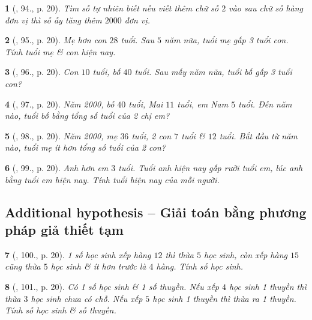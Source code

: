 \documentclass{article}
\newtheorem{baitoan}{}
\begin{document}
\begin{baitoan}[\cite{Binh_Toan_6_tap_1}, 94., p. 20]
	Tìm số tự nhiên biết nếu viết thêm chữ số $2$ vào sau chữ số hàng đơn vị thì số ấy tăng thêm $2000$ đơn vị.
\end{baitoan}

\begin{baitoan}[\cite{Binh_Toan_6_tap_1}, 95., p. 20]
	Mẹ hơn con $28$ tuổi. Sau $5$ năm nữa, tuổi mẹ gấp 3 tuổi con. Tính tuổi mẹ \& con hiện nay.
\end{baitoan}

\begin{baitoan}[\cite{Binh_Toan_6_tap_1}, 96., p. 20]
	Con $10$ tuổi, bố $40$ tuổi. Sau mấy năm nữa, tuổi bố gấp 3 tuổi con?
\end{baitoan}

\begin{baitoan}[\cite{Binh_Toan_6_tap_1}, 97., p. 20]
	Năm 2000, bố $40$ tuổi, Mai $11$ tuổi, em Nam $5$ tuổi. Đến năm nào, tuổi bố bằng tổng số tuổi của 2 chị em?
\end{baitoan}

\begin{baitoan}[\cite{Binh_Toan_6_tap_1}, 98., p. 20]
	Năm 2000, mẹ $36$ tuổi, 2 con $7$ tuổi \& $12$ tuổi. Bắt đầu từ năm nào, tuổi mẹ ít hơn tổng số tuổi của 2 con?
\end{baitoan}

\begin{baitoan}[\cite{Binh_Toan_6_tap_1}, 99., p. 20]
	Anh hơn em $3$ tuổi. Tuổi anh hiện nay gấp rưỡi tuổi em, lúc anh bằng tuổi em hiện nay. Tính tuổi hiện nay của mỗi người.
\end{baitoan}

\subsection{Additional hypothesis -- Giải toán bằng phương pháp giả thiết tạm}

\begin{baitoan}[\cite{Binh_Toan_6_tap_1}, 100., p. 20]
	1 số học sinh xếp hàng $12$ thì thừa $5$ học sinh, còn xếp hàng $15$ cũng thừa $5$ học sinh \& ít hơn trước là $4$ hàng. Tính số học sinh.
\end{baitoan}

\begin{baitoan}[\cite{Binh_Toan_6_tap_1}, 101., p. 20]
	Có 1 số học sinh \& 1 số thuyền. Nếu xếp $4$ học sinh 1 thuyền thì thừa $3$ học sinh chưa có chỗ. Nếu xếp $5$ học sinh 1 thuyền thì thừa ra 1 thuyền. Tính số học sinh \& số thuyền.
\end{baitoan}
\end{document}
